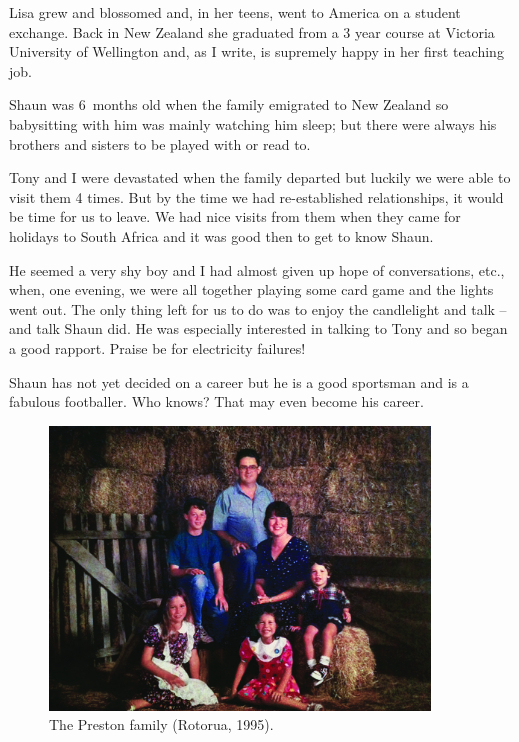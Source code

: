 Lisa grew and blossomed and, in her teens, went to America on a
student exchange. Back in New Zealand she graduated from a 3 year
course at Victoria University of Wellington and, as I write, is
supremely happy in her first teaching job.

Shaun was 6~months old when the family emigrated to New Zealand so
babysitting with him was mainly watching him sleep; but there were
always his brothers and sisters to be played with or read to.

Tony and I were devastated when the family departed but luckily we
were able to visit them 4 times. But by the time we had re-established
relationships, it would be time for us to leave. We had nice visits
from them when they came for holidays to South Africa and it was good
then to get to know Shaun.

He seemed a very shy boy and I had almost given up hope of
conversations, etc., when, one evening, we were all together playing
some card game and the lights went out. The only thing left for us to
do was to enjoy the candlelight and talk -- and talk Shaun did.  He
was especially interested in talking to Tony and so began a good
rapport. Praise be for electricity failures!

Shaun has not yet decided on a career but he is a good sportsman and
is a fabulous footballer. Who knows? That may even become his career.

\begin{figure}
  \centering
  \includegraphics[width=0.9\textwidth]{photos/preston-family}
  \caption{The Preston family (Rotorua, 1995).}
  \label{preston-family}
\end{figure}

